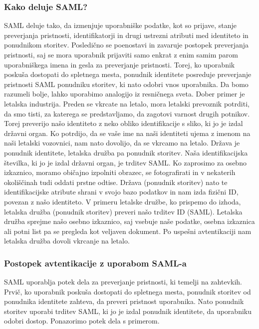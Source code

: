 \documentclass[a4paper,12pt,openright]{book}
\begin{document}
\subsubsection{Kako deluje SAML?}
SAML deluje tako, da izmenjuje uporabniške podatke, kot so prijave, stanje preverjanja pristnosti, identifikatorji in drugi ustrezni atributi med identiteto in ponudnikom storitev. Posledično se poenostavi in zavaruje postopek preverjanja pristnosti, saj se mora uporabnik prijaviti samo enkrat z enim samim parom uporabniškega imena in gesla za preverjanje pristnosti. Torej, ko uporabnik poskuša dostopati do spletnega mesta, ponudnik identitete posreduje preverjanje pristnosti SAML ponudniku storitev, ki nato odobri vnos uporabnika. Da bomo razumeli bolje, lahko uporabimo analogijo iz resničnega sveta.
\newline
Dober primer je letalska industrija. Preden se vkrcate na letalo, mora letalski prevoznik potrditi, da smo tisti, za katerega se predstavljamo, da zagotovi varnost drugih potnikov. Torej preverijo našo identiteto z neko obliko identifikacije s sliko, ki jo je izdal državni organ. Ko potrdijo, da se vaše ime na naši identiteti ujema z imenom na naši letalski vozovnici, nam nato dovolijo, da se vkrcamo na letalo.
\newline
Država je ponudnik identitete, letalska družba pa ponudnik storitev. Naša identifikacijska številka, ki jo je izdal državni organ, je trditev SAML. Ko zaprosimo za osebno izkaznico, moramo običajno izpolniti obrazec, se fotografirati in v nekaterih okoliščinah tudi oddati prstne odtise. Država (ponudnik storitev) nato te identifikacijske atribute shrani v svojo bazo podatkov in nam izda fizični ID, povezan z našo identiteto. V primeru letalske družbe, ko prispemo do izhoda, letalska družba (ponudnik storitev) preveri našo trditev ID (SAML). Letalska družba sprejme našo osebno izkaznico, saj vsebuje naše podatke, osebna izkaznica ali potni list pa se pregleda kot veljaven dokument. Po uspešni avtentikaciji nam letalska družba dovoli vkrcanje na letalo.

\subsubsection{Postopek avtentikacije z uporabom SAML-a}

SAML uporablja potek dela za preverjanje pristnosti, ki temelji na zahtevkih. Prvič, ko uporabnik poskuša dostopati do spletnega mesta, ponudnik storitev od ponudnika identitete zahteva, da preveri pristnost uporabnika. Nato ponudnik storitev uporabi trditev SAML, ki jo je izdal ponudnik identitete, da uporabniku odobri dostop. Ponazorimo potek dela s primerom.
\end{document}
